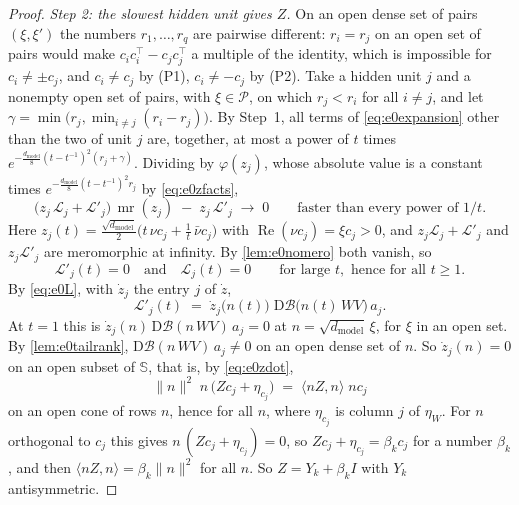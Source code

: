 \documentclass[10pt]{article}
\theoremstyle{definition}
\theoremstyle{remark}
\newcommand{\dm}{d_{\mathrm{model}}}
\newcommand{\Der}{\mathrm{D}}
\newcommand{\norm}[1]{\lVert #1\rVert}
\begin{document}
\begin{proof}
\emph{Step 2: the slowest hidden unit gives $Z$.} On an open dense set of pairs $(\xi, \xi')$ the numbers $r_1, \dots, r_q$ are pairwise different: $r_i = r_j$ on an open set of pairs would make $c_ic_i^\top - c_jc_j^\top$ a multiple of the identity, which is impossible for $c_i \neq \pm c_j$, and $c_i \neq c_j$ by (P1), $c_i \neq -c_j$ by (P2). Take a hidden unit $j$ and a nonempty open set of pairs, with $\xi \in \mathcal P$, on which $r_j < r_i$ for all $i \neq j$, and let $\gamma = \min\big(r_j, \min_{i\neq j}(r_i - r_j)\big)$. By Step~1, all terms of \eqref{eq:e0expansion} other than the two of unit $j$ are, together, at most a power of $t$ times $e^{-\frac{\dm}{8}(t - t^{-1})^2(r_j + \gamma)}$. Dividing by $\varphi(z_j)$, whose absolute value is a constant times $e^{-\frac{\dm}{8}(t - t^{-1})^2r_j}$ by \eqref{eq:e0zfacts},
\[
\big(z_j\,\mathcal L_j + \mathcal L'_j\big)\,\operatorname{mr}(z_j) \;-\; z_j\,\mathcal L'_j \;\longrightarrow\; 0 \qquad\text{faster than every power of } 1/t .
\]
Here $z_j(t) = \frac{\sqrt{\dm}}{2}\big(t\,\nu c_j + \frac1t\,\bar\nu c_j\big)$ with $\operatorname{Re}(\nu c_j) = \xi c_j > 0$, and $z_j\mathcal L_j + \mathcal L'_j$ and $z_j\mathcal L'_j$ are meromorphic at infinity. By \cref{lem:e0nomero} both vanish, so
\begin{equation}\label{eq:e0unitj}
\mathcal L'_j(t) = 0 \quad\text{and}\quad \mathcal L_j(t) = 0 \qquad\text{for large } t, \text{ hence for all } t \ge 1 .
\end{equation}
By \eqref{eq:e0L}, with $\dot z_j$ the entry $j$ of $\dot z$,
\[
\mathcal L'_j(t) \;=\; \dot z_j\big(n(t)\big)\;\Der\mathcal B\big(n(t)\,WV\big)\,a_j .
\]
At $t = 1$ this is $\dot z_j(n)\,\Der\mathcal B(n\,WV)\,a_j = 0$ at $n = \sqrt{\dm}\,\xi$, for $\xi$ in an open set. By \cref{lem:e0tailrank}, $\Der\mathcal B(n\,WV)\,a_j \neq 0$ on an open dense set of $n$. So $\dot z_j(n) = 0$ on an open subset of $\mathbb S$, that is, by \eqref{eq:e0zdot},
\[
\norm{n}^2\;n\,\big(Zc_j + \eta_{c_j}\big) \;=\; \langle nZ, n\rangle\;nc_j
\]
on an open cone of rows $n$, hence for all $n$, where $\eta_{c_j}$ is column $j$ of $\eta_W$. For $n$ orthogonal to $c_j$ this gives $n\,(Zc_j + \eta_{c_j}) = 0$, so $Zc_j + \eta_{c_j} = \beta_kc_j$ for a number $\beta_k$, and then $\langle nZ, n\rangle = \beta_k\norm{n}^2$ for all $n$. So $Z = Y_k + \beta_kI$ with $Y_k$ antisymmetric.


\end{proof}
\end{document}
